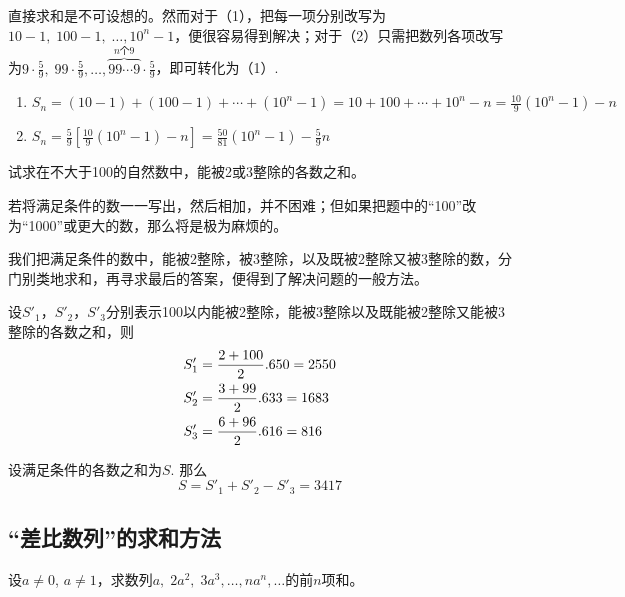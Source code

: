 \begin{analyze}
直接求和是不可设想的。然而对于（1），把每一项分别改写为$10-1,\; 100-1,\; \ldots,10^n-1$，便很容易得到解决；对于（2）只需把数列各项改写为$9\cdot\frac{5}{9},\; 99\cdot\frac{5}{9},\ldots, \overbrace{99\cdots 9}^{\text{$n$个9}}\cdot\frac{5}{9}$，即可转化为（1）.
\end{analyze}

\begin{solution}
\begin{enumerate}[(1)]
    \item $S_n=(10-1)+(100-1)+\cdots +(10^n-1)=10+100+\cdots+10^n - n=\frac{10}{9}(10^n-1)-n$
\item $S_n=\frac{5}{9}\left[\frac{10}{9}(10^n-1)-n\right]=\frac{50}{81}(10^n-1)-\frac{5}{9}n$
\end{enumerate}
\end{solution}


\begin{example}
    试求在不大于100的自然数中，能被2或3整除的各数之和。
\end{example}

\begin{analyze}
若将满足条件的数一一写出，然后相加，并不困难；但如果把题中的“100”改为“1000”或更大的数，那么将是极为麻烦的。

我们把满足条件的数中，能被2整除，被3整除，以及既被2整除又被3整除的数，分门别类地求和，再寻求最后的答案，便得到了解决问题的一般方法。
\end{analyze}

\begin{solution}
设$S'_1$，$S'_2$，$S'_3$分别表示100以内能被2整除，能被3整除以及既能被2整除又能被3整除的各数之和，则    
\[\begin{split}
    S'_1&=\dfrac{2+100}{2}.6 50=2550\\
    S'_2&=\dfrac{3+99}{2}.6 33=1683\\
    S'_3&=\dfrac{6+96}{2}.6 16=816\\
\end{split}\]

设满足条件的各数之和为$S$. 那么
\[S=S'_1+S'_2-S'_3=3417\]
\end{solution}

\subsection{“差比数列”的求和方法}



\begin{example}
    设$a\ne 0$, $a\ne 1$，求数列$a,\; 2a^2,\; 3a^3,\ldots,na^n,\ldots$的前$n$项和。
\end{example}

